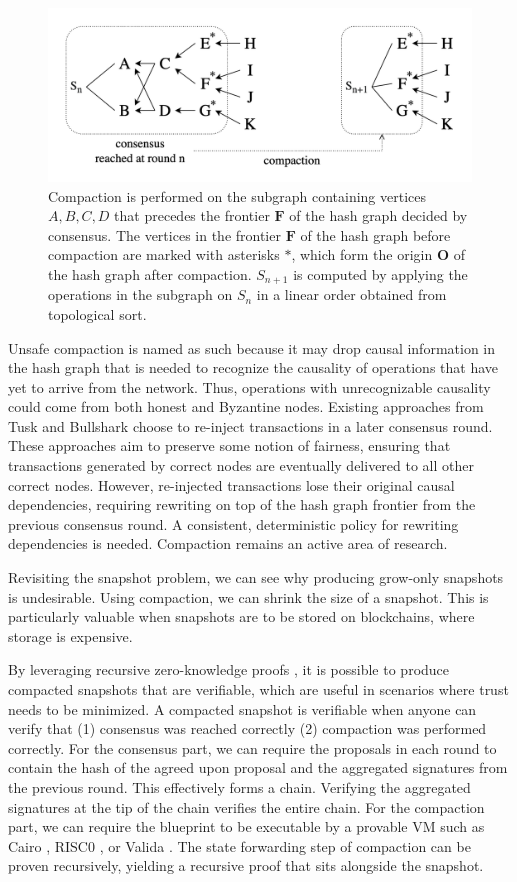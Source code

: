 \documentclass{article}
\begin{document}
\begin{figure}[htp]
    \centering
    \includegraphics[width=13cm]{fig6}
    \caption{Compaction is performed on the subgraph containing vertices $A,B,C,D$ that precedes the frontier $\textbf{F}$ of the hash graph decided by consensus. The vertices in the frontier $\textbf{F}$ of the hash graph before compaction are marked with asterisks $*$, which form the origin $\textbf{O}$ of the hash graph after compaction. $S_{n+1}$ is computed by applying the operations in the subgraph on $S_n$ in a linear order obtained from topological sort.}
    \label{fig:6}
\end{figure}

Unsafe compaction is named as such because it may drop causal information in the hash graph that is needed to recognize the causality of operations that have yet to arrive from the network. Thus, operations with unrecognizable causality could come from both honest and Byzantine nodes. Existing approaches from Tusk \cite{Tusk} and Bullshark \cite{Bullshark} choose to re-inject transactions in a later consensus round. These approaches aim to preserve some notion of fairness, ensuring that transactions generated by correct nodes are eventually delivered to all other correct nodes. However, re-injected transactions lose their original causal dependencies, requiring rewriting on top of the hash graph frontier from the previous consensus round. A consistent, deterministic policy for rewriting dependencies is needed. Compaction remains an active area of research.

Revisiting the snapshot problem, we can see why producing grow-only snapshots is undesirable. Using compaction, we can shrink the size of a snapshot. This is particularly valuable when snapshots are to be stored on blockchains, where storage is expensive.

By leveraging recursive zero-knowledge proofs \cite{Recursive-SNARK}, it is possible to produce compacted snapshots that are verifiable, which are useful in scenarios where trust needs to be minimized. A compacted snapshot is verifiable when anyone can verify that (1) consensus was reached correctly (2) compaction was performed correctly. For the consensus part, we can require the proposals in each round to contain the hash of the agreed upon proposal and the aggregated signatures from the previous round. This effectively forms a chain. Verifying the aggregated signatures at the tip of the chain verifies the entire chain. For the compaction part, we can require the blueprint to be executable by a provable VM such as Cairo \cite{Cairo}, RISC0 \cite{RISC0}, or Valida \cite{Valida}. The state forwarding step of compaction can be proven recursively, yielding a recursive proof that sits alongside the snapshot.
\end{document}
